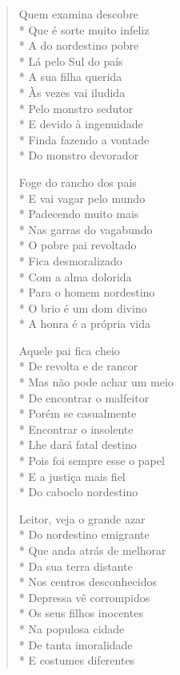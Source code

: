 \begin{verse}
Quem examina descobre\\*
Que é sorte muito infeliz\\*
A do nordestino pobre\\*
Lá pelo Sul do país\\*
A sua filha querida\\*
Às vezes vai iludida\\*
Pelo monstro sedutor\\*
E devido à ingenuidade\\*
Finda fazendo a vontade\\*
Do monstro devorador

Foge do rancho dos pais\\*
E vai vagar pelo mundo\\*
Padecendo muito mais\\*
Nas garras do vagabundo\\*
O pobre pai revoltado\\*
Fica desmoralizado\\*
Com a alma dolorida\\*
Para o homem nordestino\\*
O brio é um dom divino\\*
A honra é a própria vida

Aquele pai fica cheio\\*
De revolta e de rancor\\*
Mas não pode achar um meio\\*
De encontrar o malfeitor\\*
Porém se casualmente\\*
Encontrar o insolente\\*
Lhe dará fatal destino\\*
Pois foi sempre esse o papel\\*
E a justiça mais fiel\\*
Do caboclo nordestino

Leitor, veja o grande azar\\*
Do nordestino emigrante\\*
Que anda atrás de melhorar\\*
Da sua terra distante\\*
Nos centros desconhecidos\\*
Depressa vê corrompidos\\*
Os seus filhos inocentes\\*
Na populosa cidade\\*
De tanta imoralidade\\*
E costumes diferentes


\end{verse}
